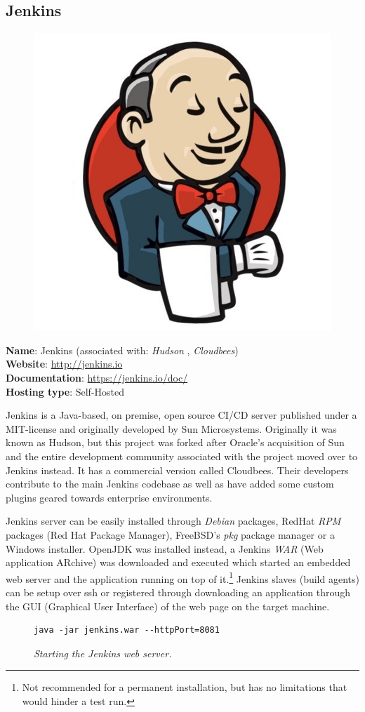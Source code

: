 \pagebreak

\subsection{Jenkins}
\begin{figure}
    \vspace{-50pt}
    \includegraphics[width=.3\textwidth]{figures/brand/jenkins.jpeg}  
    \vspace{-30pt}
\end{figure}
\textbf{Name}: Jenkins (associated with: \textit{Hudson} , \textit{Cloudbees})\\
\textbf{Website}: \url{http://jenkins.io}\\
\textbf{Documentation}: \url{https://jenkins.io/doc/}\\
\textbf{Hosting type}: Self-Hosted

Jenkins is a Java-based, on premise, open source CI/CD server published under a MIT-license and originally developed by Sun Microsystems. Originally it was known as Hudson, but this project was forked after Oracle's acquisition of Sun and the entire development community associated with the project moved over to Jenkins instead. It has a commercial version called Cloudbees. Their developers contribute to the main Jenkins codebase as well as have added some custom plugins geared towards enterprise environments.\cite{cloudbees} 

Jenkins server can be easily installed through \textit{Debian} packages, RedHat \textit{RPM} packages (Red Hat Package Manager), FreeBSD's \textit{pkg} package manager or a Windows installer. OpenJDK was installed instead, a Jenkins \textit{WAR} (Web application ARchive) was downloaded and executed which started an embedded web server and the application running on top of it.\footnote{Not recommended for a permanent installation, but has no limitations that would hinder a test run.} Jenkins slaves (build agents) can be setup over ssh or registered through downloading an application through the GUI (Graphical User Interface) of the web page on the target machine.
\begin{figure}[H]
\centering
\begin{lstlisting}[frame=single, basicstyle=\small, linewidth=\textwidth]
java -jar jenkins.war --httpPort=8081
\end{lstlisting}
\caption{\textit{Starting the Jenkins web server.}}
\label{fig:jenkins-start}
\end{figure}

